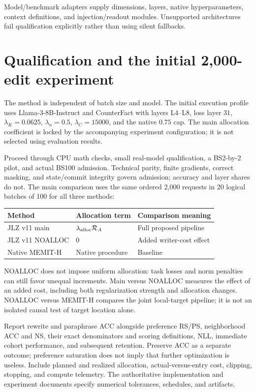 \documentclass[11pt]{article}
\begin{document}
Model/benchmark adapters supply dimensions, layers, native hyperparameters,
context definitions, and injection/readout modules. Unsupported architectures
fail qualification explicitly rather than using silent fallbacks.

\section{Qualification and the initial 2,000-edit experiment}
The method is independent of batch size and model. The initial execution profile
uses Llama-3-8B-Instruct and CounterFact with layers L4--L8, loss layer 31,
$\lambda_K=0.0625$, $\lambda_n=0.5$, $\lambda_C=15000$, and the native
$0.75$ cap. The main allocation coefficient is locked by the accompanying
experiment configuration; it is not selected using evaluation results.

Proceed through CPU math checks, small real-model qualification, a BS2-by-2
pilot, and actual BS100 admission. Technical parity, finite gradients, correct
masking, and state/commit integrity govern admission; accuracy and layer shares
do not. The main comparison uses the same ordered 2,000 requests in 20 logical
batches of 100 for all three methods:
\begin{center}
\begin{tabular}{lll}
\toprule
Method & Allocation term & Comparison meaning\\
\midrule
JLZ v11 main & $\lambda_{\rm alloc}\mathcal R_A$ & Full proposed pipeline\\
JLZ v11 NOALLOC & $0$ & Added writer-cost effect\\
Native MEMIT-H & Native procedure & Baseline\\
\bottomrule
\end{tabular}
\end{center}
NOALLOC does not impose uniform allocation: task losses and norm penalties can
still favor unequal increments. Main versus NOALLOC measures the effect of an
added cost, including both regularization strength and allocation changes.
NOALLOC versus MEMIT-H compares the joint local-target pipeline; it is not an
isolated causal test of target location alone.

Report rewrite and paraphrase ACC alongside preference RS/PS, neighborhood
ACC and NS, their exact denominators and scoring definitions, NLL, immediate
cohort performance, and subsequent retention. Preserve ACC as a separate
outcome; preference saturation does not imply that further optimization is
useless. Include planned and realized allocation, actual-versus-entry cost,
clipping, stopping, and compute telemetry. The authoritative implementation and
experiment documents specify numerical tolerances, schedules, and artifacts.
\end{document}
